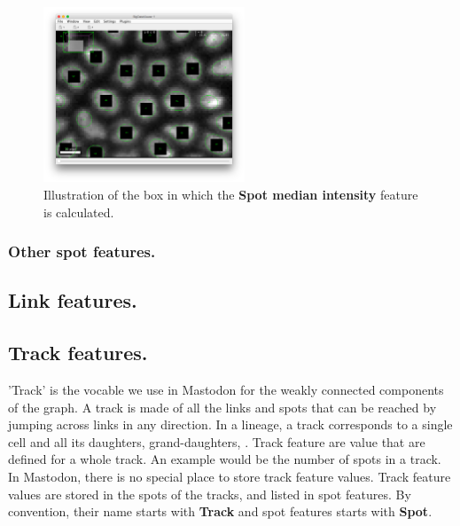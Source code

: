 \begin{figure}
    \centering
    \includegraphics[width=6cm]{figures/Mastodon_Median-feature-pixels.png}
    \caption{Illustration of the box in which the \textbf{Spot median intensity} feature is calculated.}
    \label{fig:SpotMedianBox}
\end{figure}

\subsubsection{Other spot features.}


\subsection{Link features.}



\subsection{Track features.}

'Track' is the vocable we use in Mastodon for the weakly connected components of the graph.
A track is made of all the links and spots that can be reached by jumping across links in any direction.
In a lineage, a track corresponds to a single cell and all its daughters, grand-daughters, \etc.
Track feature are value that are defined for a whole track. 
An example would be the number of spots in a track.
In Mastodon, there is no special place to store track feature values.
Track feature values are stored in the spots of the tracks, and listed in spot features.
By convention, their name starts with \textbf{Track} and spot features starts with \textbf{Spot}.


